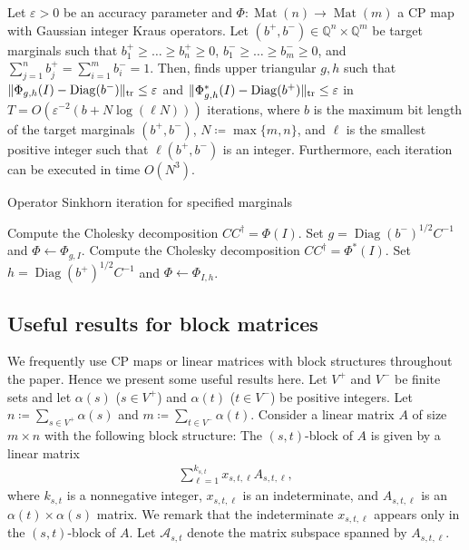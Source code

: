 \documentclass[a4paper,11pt]{article}
\numberwithin{equation}{section}
\newcommand{\Q}{\mathbb{Q}}
\newcommand{\caA}{\mathcal{A}}
\newcommand{\eps}{\varepsilon}
\DeclareMathOperator{\Mat}{Mat}
\DeclareMathOperator{\tr}{tr}
\DeclareMathOperator{\Diag}{Diag}
\DeclarePairedDelimiter{\norm}{\lVert}{\rVert}
\begin{document}
\begin{theorem}
    Let $\eps > 0$ be an accuracy parameter and $\Phi: \Mat(n) \to \Mat(m)$ a CP map with Gaussian integer Kraus operators.
    Let $(b^+, b^-) \in \Q^n \times \Q^m$ be target marginals such that $b^+_1 \geq \dots \geq b^+_n \geq 0$, $b^-_1 \geq \dots \geq b^-_m \geq 0$, and $\sum_{j=1}^n b^+_j = \sum_{i=1}^m b^-_i = 1$.
    Then,  finds upper triangular $g, h$ such that $\norm{\Phi_{g,h}(I) - \Diag(b^-)}_{\tr} \leq \eps$ and $\norm{\Phi_{g,h}^*(I) - \Diag(b^+)}_{\tr} \leq \eps$ in 
    $
    T = O(\eps^{-2}(b + N \log (\ell N)))
    $
    iterations, where $b$ is the maximum bit length of the target marginals $(b^+, b^-)$, $N \coloneqq \max\{m, n\}$, and $\ell$ is the smallest positive integer such that $\ell(b^+, b^-)$ is an integer.
    Furthermore, each iteration can be executed in time $O(N^3)$.
\end{theorem}

\begin{algorithm}
    \caption{Operator Sinkhorn iteration for specified marginals~\citep{Franks2018,Burgisser2018a}\label{alg:marginals}}
\begin{algorithmic}[1]
        \State {}
        \State Compute the Cholesky decomposition $CC^\dagger = \Phi(I)$. Set $g = \Diag(b^-)^{1/2}C^{-1}$ and $\Phi \gets \Phi_{g,I}$.
        \State {}
        \State Compute the Cholesky decomposition $CC^\dagger = \Phi^*(I)$. Set $h = \Diag(b^+)^{1/2}C^{-1}$ and $\Phi \gets \Phi_{I,h}$.
    \EndFor
\end{algorithmic}
\end{algorithm}

\subsection{Useful results for block matrices}\label{subsec:block-matrix}
We frequently use CP maps or linear matrices with block structures throughout the paper.
Hence we present some useful results here.
Let $V^+$ and $V^-$ be finite sets and let $\alpha(s)$ ($s \in V^+$) and $\alpha(t)$ ($t \in V^-$) be positive integers.
Let $n \coloneqq \sum_{s \in V^+} \alpha(s)$ and $m \coloneqq \sum_{t \in V^-} \alpha(t)$.
Consider a linear matrix $A$ of size $m \times n$ with the following block structure:
The $(s,t)$-block of $A$ is given by a linear matrix 
\begin{align}\label{eq:partitioned-matrix}
    \sum_{\ell = 1}^{k_{s,t}} x_{s,t,\ell} A_{s,t,\ell},
\end{align}
where $k_{s,t}$ is a nonnegative integer, $x_{s,t,\ell}$ is an indeterminate, and $A_{s,t,\ell}$ is an $\alpha(t) \times \alpha(s)$ matrix.
We remark that the indeterminate $x_{s,t,\ell}$ appears only in the $(s,t)$-block of $A$.
Let $\caA_{s,t}$ denote the matrix subspace spanned by $A_{s,t,\ell}$.
\end{document}

